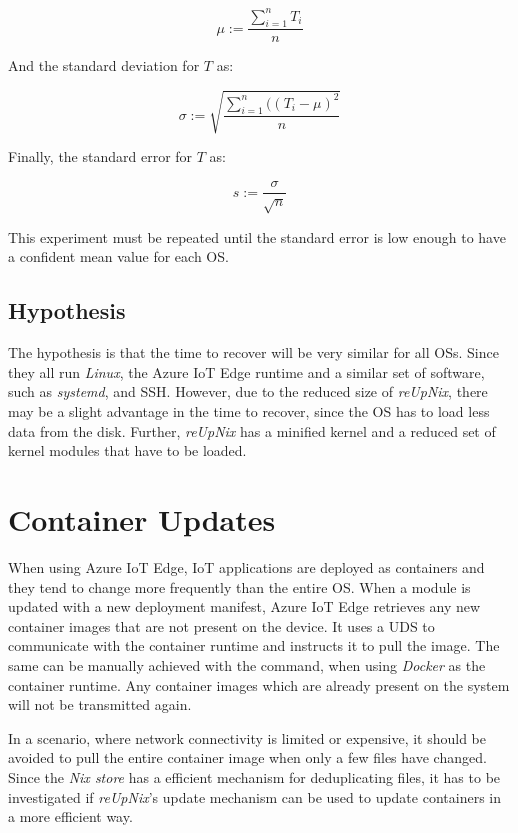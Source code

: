 \begin{equation}
    \mu := \frac{\sum_{i=1}^{n}T_i}{n}
\end{equation}

\noindent
And the standard deviation for $T$ as:

\begin{equation}
   \sigma := \sqrt{\frac{\sum_{i=1}^{n}((T_i - \mu)^2}{n}}
\end{equation}

\noindent
Finally, the standard error for $T$ as:

\begin{equation}
    s := \frac{\sigma}{\sqrt{n}}
\end{equation}

\noindent
This experiment must be repeated until the standard error is low enough
to have a confident mean value for each \ac{OS}.

\subsection{Hypothesis}
The hypothesis is that the time to recover will be very similar for all
\ac{OS}s. Since they all run \textit{Linux}, the Azure IoT Edge runtime and
a similar set of software, such as \textit{systemd}, and \ac{SSH}. However, due
to the reduced size of \textit{reUpNix}, there may be a slight advantage in the
time to recover, since the \ac{OS} has to load less data from the disk. Further,
\textit{reUpNix} has a minified kernel and a reduced set of kernel modules that
have to be loaded.

\section{Container Updates}
\label{sec:container-updates}
When using Azure IoT Edge, \ac{IoT} applications are deployed as containers and
they tend to change more frequently than the entire \ac{OS}. When a module is updated
with a new deployment manifest, Azure IoT Edge retrieves any new container
images that are not present on the device. It uses a \ac{UDS} to communicate
with the container runtime and instructs it to pull the image. The same can be
manually achieved with the  command, when using \textit{Docker}
as the container runtime. Any container images which are already present on the
system will not be transmitted again.

In a scenario, where network connectivity is limited or expensive,
it should be avoided to pull the entire container image when only a few files have
changed. Since the \textit{Nix store} has a efficient mechanism for
deduplicating files, it has to be investigated if \textit{reUpNix}'s
update mechanism can be used to update containers in a more efficient way.

